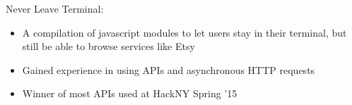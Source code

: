 \documentclass[11pt]{article}
\begin{document}
\headedsubsection
{Never Leave Terminal:}{}
{
    \begin{itemize}[leftmargin=0.5in]
        \item{A compilation of javascript modules to let users stay in their terminal, but still be able to browse services like Etsy}
        \item{Gained experience in using APIs and asynchronous HTTP requests}
        \item{Winner of most APIs used at HackNY Spring '15}
    \end{itemize}
}
\end{document}
